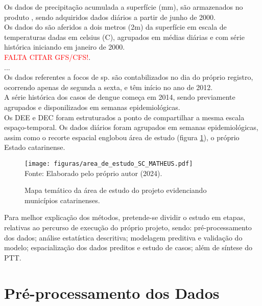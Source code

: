 \indent Os dados de precipitação acumulada a superfície (mm), são armazenados no produto ,  sendo adquiridos dados diários a partir de junho de 2000.\\
\indent Os dados do  são aferidos a dois metros (2m) da superfície em escala de temperaturas dadas em celsius (C), agrupados em médias diárias e com série histórica iniciando em janeiro de 2000.\\
\indent \textcolor{red}{FALTA CITAR GFS/CFS!}.\\
\indent ...\\
\indent Os dados referentes a focos de  sp. são contabilizados no dia do próprio registro, ocorrendo apenas de segunda a sexta, e têm início no ano de 2012.\\
\indent A série histórica dos casos de dengue começa em 2014, sendo previamente agrupados e disponilizados em semanas epidemiológicas.\\
\indent Os \acrshort{DEE} e \acrshort{DEC} foram estruturados a ponto de compartilhar a mesma escala espaço-temporal. Os dados diários foram agrupados em semanas epidemiológicas, assim como o recorte espacial englobou área de estudo (figura \ref{fig:area_de_estudo}), o próprio Estado catarinense.
\begin{figure}[h]
    \centering
    \caption{Mapa temático da área de estudo do projeto evidenciando municípios catarinenses.}
    \texttt{[image: figuras/area\_de\_estudo\_SC\_MATHEUS.pdf]}
    \label{fig:area_de_estudo}
    \\
    \vspace{-0.05cm}\hspace{-7.5cm}\small{Fonte: Elaborado pelo próprio autor (2024).} 
\end{figure}

\indent Para melhor explicação dos métodos, pretende-se dividir o estudo em etapas, relativas ao percurso de execução do próprio projeto, sendo: pré-processamento dos dados; análise estatística descritiva; modelagem preditiva e validação do modelo; espacialização dos dados preditos e estudo de casos; além de síntese do \acrfull{PTT}.


\section{Pré-processamento dos Dados}

